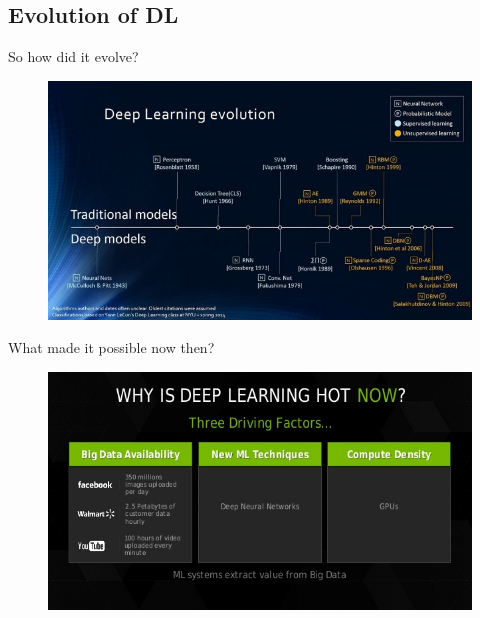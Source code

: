 \documentclass[10pt]{beamer}
\begin{document}
	\subsection{Evolution of DL}
	\begin{frame}[c]{So how did it evolve?}
		\begin{figure}
			\includegraphics[width=\linewidth]{images/evolution}
		\end{figure}
	\end{frame}
	\begin{frame}[c]{What made it possible now then?}
		\begin{figure}
			\includegraphics[width=\linewidth]{images/why_now}
		\end{figure}
	\end{frame}
	
\end{document}
